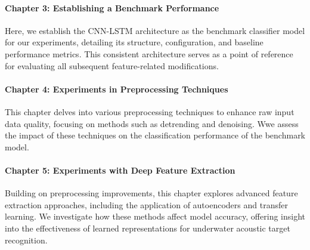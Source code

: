\paragraph{Chapter 3: Establishing a Benchmark Performance} Here, we establish the CNN-LSTM architecture as the benchmark classifier model for our experiments, detailing its structure, configuration, and baseline performance metrics. This consistent architecture serves as a point of reference for evaluating all subsequent feature-related modifications.

\paragraph{Chapter 4: Experiments in Preprocessing Techniques} This chapter delves into various preprocessing techniques to enhance raw input data quality, focusing on methods such as detrending and denoising. Wwe assess the impact of these techniques on the classification performance of the benchmark model.

\paragraph{Chapter 5: Experiments with Deep Feature Extraction} Building on preprocessing improvements, this chapter explores advanced feature extraction approaches, including the application of autoencoders and transfer learning. We investigate how these methods affect model accuracy, offering insight into the effectiveness of learned representations for underwater acoustic target recognition.
